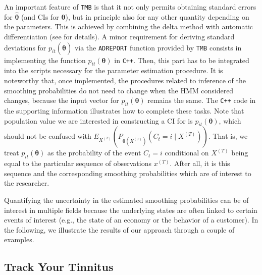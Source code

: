 \documentclass[]{interact}\usepackage[]{graphicx}\usepackage[dvipsnames]{xcolor}
\theoremstyle{plain}%
\theoremstyle{definition}
\theoremstyle{remark}
\begin{document}
An important feature of {\tt{TMB}} is that it not only permits obtaining standard errors for $\hat{\bm{\theta}}$ (and CIs for $\bm{\theta}$), but in principle also for any other quantity depending on the parameters. This is achieved by combining the delta method with automatic differentiation (see \citep{kristensen} for details).
A minor requirement for deriving standard deviations for $p_{it}(\hat{\bm{\theta}})$ via the \texttt{ADREPORT} function provided by {\tt{TMB}} consists in implementing the function $p_{it}(\bm{\theta})$ in \texttt{C++}. Then, this part has to be integrated into the scripts necessary for the parameter estimation procedure. It is noteworthy that, once implemented, the procedures related to inference of the smoothing probabilities do not need to change when the HMM considered changes, because the input vector for $p_{it}(\bm{\theta})$ remains the same. The \texttt{C++} code in the supporting information illustrates how to complete these tasks. Note that population value we are interested in constructing a CI for is $p_{it}(\bm{\theta}) $, which should not be confused with  $E_{X^{(T)}}\left(P_{\hat{\bm{\theta}}(X^{(T)})}(C_t = i\mid X^{(T)})\right)$. That is, we treat $p_{it}(\bm{\theta})$ as the probability of the event $C_t=i$ conditional on $X^{(T)}$ being equal to the particular sequence of observations $x^{(T)}$. After all, it is this sequence and the corresponding smoothing probabilities which are of interest to the researcher. 

Quantifying the uncertainty in the estimated smoothing probabilities can be of interest in multiple fields because the underlying states are often linked to certain events of interest (e.g., the state of an economy or the behavior of a customer). In the following, we illustrate the results of our approach through a couple of examples.


\subsection{Track Your Tinnitus}
\label{sec:sm-tyt}
\end{document}
